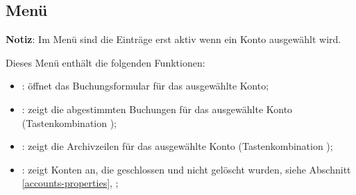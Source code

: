 \subsection{Menü \label{home-menus-display}}

\textbf{Notiz}: Im Menü  sind die Einträge erst aktiv wenn ein Konto ausgewählt wird.%

Dieses Menü enthält die folgenden Funktionen:%

\vspace{3mm}
\noindent
\begin{minipage}{.7\linewidth}
	\begin{itemize}[rightmargin=.6cm]
	\item {}: öffnet das Buchungsformular für das ausgewählte Konto;
	\item {}: zeigt die abgestimmten Buchungen für das ausgewählte Konto (Tastenkombination );
	\item {}: zeigt die Archivzeilen für das ausgewählte Konto (Tastenkombination );
	\item {}: zeigt Konten an, die geschlossen und nicht gelöscht wurden, siehe Abschnitt \vref{accounts-properties}, ; %
	\end{itemize}
\end{minipage}
